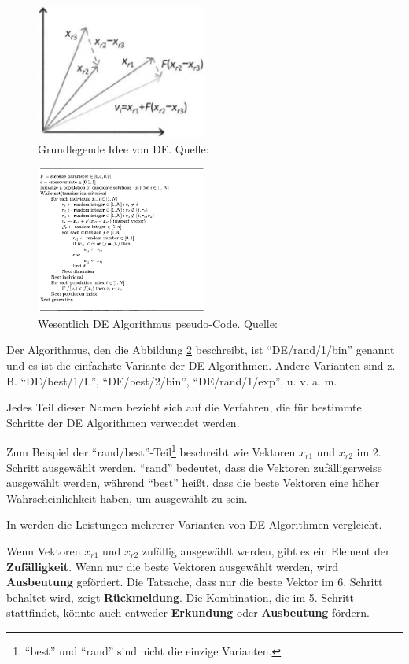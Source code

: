 \documentclass[twoside,twocolumn]{article}
\begin{document}
\begin{figure}[h]
\caption{Grundlegende Idee von DE. Quelle: \cite{wiley_evolutionary}}
\label{fig:de_beispiel}
\centering
\includegraphics[width=0.5\textwidth]{images/de_beispiel.png}
\end{figure}

\begin{figure}[h]
\caption{Wesentlich DE Algorithmus pseudo-Code. Quelle: \cite{wiley_evolutionary}}
\label{fig:de_pseudo}
\centering
\includegraphics[width=0.5\textwidth]{images/de_pseudo.png}
\end{figure}

Der Algorithmus, den die Abbildung \ref{fig:de_pseudo} beschreibt, ist \enquote{DE/rand/1/bin} genannt und es ist die einfachste Variante der DE Algorithmen. Andere Varianten sind z. B. \enquote{DE/best/1/L}, \enquote{DE/best/2/bin}, \enquote{DE/rand/1/exp},  u. v. a. m.\par
Jedes Teil dieser Namen bezieht sich auf die Verfahren, die für bestimmte Schritte der DE Algorithmen verwendet werden.\par
Zum Beispiel der \enquote{rand/best}-Teil\footnote{\enquote{best} und \enquote{rand} sind nicht die einzige Varianten.} beschreibt wie Vektoren $x_{r1}$ und $x_{r2}$ im 2. Schritt ausgewählt werden. \enquote{rand} bedeutet, dass die Vektoren zufälligerweise ausgewählt werden, während \enquote{best} heißt, dass die beste Vektoren eine höher Wahrscheinlichkeit haben, um ausgewählt zu sein.\par
In \cite{love_u_mex} werden die Leistungen mehrerer Varianten von DE Algorithmen vergleicht.\par
Wenn Vektoren $x_{r1}$ und $x_{r2}$ zufällig ausgewählt werden, gibt es ein Element der \textbf{Zufälligkeit}. Wenn nur die beste Vektoren ausgewählt werden, wird \textbf{Ausbeutung} gefördert. Die Tatsache, dass nur die beste Vektor im 6. Schritt behaltet wird, zeigt \textbf{Rückmeldung}. Die Kombination, die im 5. Schritt stattfindet, könnte auch entweder \textbf{Erkundung} oder \textbf{Ausbeutung} fördern.
\end{document}
